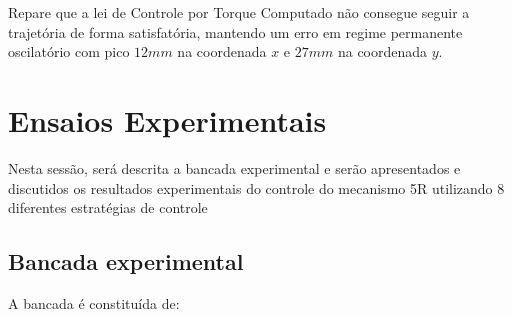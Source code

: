 \documentclass[]{politex}
\begin{document}
Repare que a lei de Controle por Torque Computado não consegue seguir a trajetória de forma satisfatória, mantendo um erro em regime permanente oscilatório com pico $12 mm$ na coordenada $x$ e $27 mm$ na coordenada $y$.

\section{Ensaios Experimentais}

Nesta sessão, será descrita a bancada experimental e serão apresentados e discutidos os resultados experimentais do controle do mecanismo 5R utilizando 8 diferentes estratégias de controle

\subsection{Bancada experimental}

A bancada é constituída de:
\end{document}
